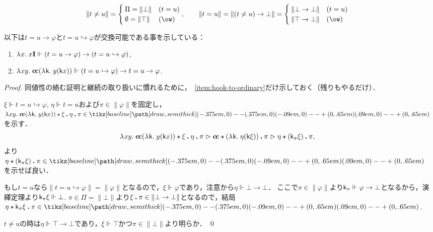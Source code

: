 \documentclass[realisability.tex]{subfiles}
\begin{document}
\begin{remark}
 \[
  \| t \neq u\| =
  \begin{cases}
   \Pi = \|\bot\| & (t = u) \\
   \emptyset = \|\top\| & (\ow)
  \end{cases}, \qquad
  \| t = u \| = \| (t \neq u) \to \bot \|
  = \begin{cases}
     \|\bot \to \bot\|& (t = u)\\
     \|\top \to \bot\|& (\ow)
    \end{cases}
 \]
\end{remark}

以下は$t = u \to \varphi$と$t = u \hookrightarrow \varphi$が交換可能である事を示している：
\begin{lemma}
 \begin{enumerate}
  \item $\lambda^{\mathsf{}}x.\;x \mathsf{\mathbf{I}} \Vdash (t = u \to \varphi) \to (t = u \hookrightarrow \varphi)$,
  \item\label{item:hook-to-ordinary}
       $\lambda^{\mathsf{}}xy.\;\mathsf{\mathbf{c\hspace{-1pt}c}} (\lambda^{\mathsf{}}\mathsf{k}.\;y (\mathsf{k} x)) \Vdash (t = u \hookrightarrow \varphi) \to t = u \to \varphi$.
 \end{enumerate}
\end{lemma}
\begin{proof}
 同値性の絡む証明と継続の取り扱いに慣れるために，~\ref{item:hook-to-ordinary}だけ示しておく（残りもやるだけ）．

 $\xi \Vdash t = u \hookrightarrow \varphi$, $\eta \Vdash t = u$および$\pi \in \|\varphi\|$を固定し，$\abs{xy}{\cc (\abs{\conti}{y (\conti x)})} \cons \xi \push \eta \push \pi \in \pole$を示す．
 \[
  \lambda^{\mathsf{}}xy.\;\mathsf{\mathbf{c\hspace{-1pt}c}} (\lambda^{\mathsf{}}\mathsf{k}.\;y (\mathsf{k} x))  \mathbin{\star} \xi \mathbin{\boldsymbol{.}} \eta \mathbin{\boldsymbol{.}} \pi
 \mathrel{\rhd}
  \mathsf{\mathbf{c\hspace{-1pt}c}} \mathbin{\star} (\lambda^{\mathsf{}}\mathsf{k}.\;\eta (\mathsf{k} \xi)) \mathbin{\boldsymbol{.}} \pi
 \mathrel{\rhd}
  \eta \mathbin{\star} (\mathsf{k}_\pi \xi) \mathbin{\boldsymbol{.}} \pi,
 \]
 より$\KVM{\eta {{(\conti_\pi \xi)}} \pi}  \in \pole$を示せば良い．

 もし$t = u$なら$\|t = u \hookrightarrow \varphi\| = \|\varphi\|$となるので，$\xi \Vdash \varphi$であり，注意から$\eta \Vdash \bot \to \bot$．
 ここで$\pi \in \|\varphi\|$より$\mathsf{k}_\pi \Vdash \varphi \to \bot$となるから，演繹定理より$\mathsf{k}_\pi \xi \Vdash \bot$.
 $\pi \in \Pi = \|\bot\|$より$\xi \mathbin{\boldsymbol{.}} \pi \in \|\bot \to \bot\|$となるので，結局$\KVM{\eta {{\conti_\pi \xi}} \pi} \in \pole$.

 $t \neq u$の時は$\eta \Vdash \top \to \bot$であり，$\xi \Vdash \top$かつ$\pi \in \|\bot\|$より明らか． \qed
\end{proof}
\end{document}

